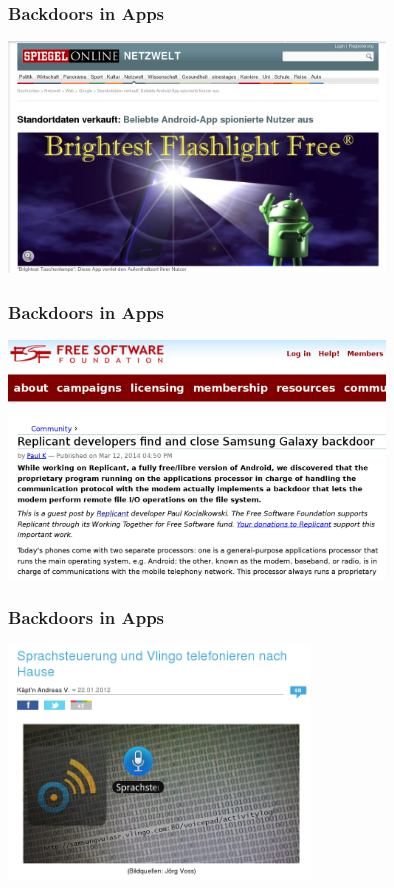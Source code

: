 \documentclass[12pt]{beamer}
\begin{document}
\begin{frame}
  \frametitle{Backdoors in Apps}
  \begin{center}
    \includegraphics[width=10cm]{img/backdoor-flashlight}
  \par\end{center}
\end{frame}

\begin{frame}
  \frametitle{Backdoors in Apps}
  \begin{center}
    \includegraphics[width=10cm]{img/backdoor-samsung}
  \par\end{center}
\end{frame}

\begin{frame}
  \frametitle{Backdoors in Apps}
  \begin{center}
    \includegraphics[width=8cm]{img/backdoor-samsung2}
  \par\end{center}
\end{frame}
\end{document}
